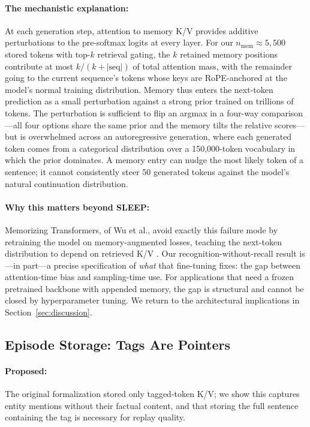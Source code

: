 \paragraph{The mechanistic explanation:} At each generation step, attention to memory K/V provides additive perturbations to the pre-softmax logits at every layer. For our $n_{\mathrm{mem}} \approx 5{,}500$ stored tokens with top-$k$ retrieval gating, the $k$ retained memory positions contribute at most $k/(k + |\text{seq}|)$ of total attention mass, with the remainder going to the current sequence's tokens whose keys are RoPE-anchored at the model's normal training distribution. Memory thus enters the next-token prediction as a small perturbation against a strong prior trained on trillions of tokens. The perturbation is sufficient to flip an argmax in a four-way comparison---all four options share the same prior and the memory tilts the relative scores---but is overwhelmed across an autoregressive generation, where each generated token comes from a categorical distribution over a 150{,}000-token vocabulary in which the prior dominates. A memory entry can nudge the most likely token of a sentence; it cannot consistently steer 50 generated tokens against the model's natural continuation distribution.

\paragraph{Why this matters beyond SLEEP:} Memorizing Transformers, of Wu et al., avoid exactly this failure mode by retraining the model on memory-augmented losses, teaching the next-token distribution to depend on retrieved K/V \citep{wu2022memorizing}. Our recognition-without-recall result is---in part---a precise specification of \emph{what} that fine-tuning fixes: the gap between attention-time bias and sampling-time use. For applications that need a frozen pretrained backbone with appended memory, the gap is structural and cannot be closed by hyperparameter tuning. We return to the architectural implications in Section~\ref{sec:discussion}.

\subsection{Episode Storage: Tags Are Pointers}
\label{sec:results_episodes}

\paragraph{Proposed:} The original formalization stored only tagged-token K/V; we show this captures entity mentions without their factual content, and that storing the full sentence containing the tag is necessary for replay quality.

